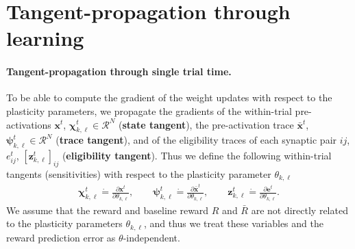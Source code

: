 \documentclass[mlabstract]{jmlr}
\begin{document}
\section{Tangent-propagation through learning}\label{apd:tangents}

\paragraph{Tangent-propagation through single trial time.}
To be able to compute the gradient of the weight updates with respect to the plasticity parameters, we propagate the gradients of the within-trial pre-activations $\mathbf{x}^t$, $\boldsymbol{\chi}_{k,\ell}^t \in \mathcal{R}^N$ (\textbf{state tangent}), the pre-activation trace $\bar{\mathbf{x}}^t$, $\boldsymbol{\psi}_{k,\ell}^t \in \mathcal{R}^N$ (\textbf{trace tangent}), and of the eligibility traces of each synaptic pair $ij$, $e^t_{ij}$, ${[\mathbf{z}^t_{k,\ell}]}_{ij}$ (\textbf{eligibility tangent}).
Thus we define the 
following within-trial tangents (sensitivities) with respect to the plasticity parameter $\theta_{k,\ell}$
\begin{align}\label{eq:single_sensitivities_1}
\boldsymbol{\chi}_{k,\ell}^t \dot{=} \frac{\partial \mathbf{x}^t}{\partial\theta_{k,\ell}},\qquad
\boldsymbol{\psi}_{k,\ell}^t \dot{=} \frac{\partial \mathbf{\bar{x}}^t}{\partial\theta_{k,\ell}},\qquad
\mathbf{z}_{k,\ell}^t \dot{=} \frac{\partial \mathbf{e}^t}{\partial\theta_{k,\ell}}.
\end{align}
We assume that the reward and baseline reward $R$ and $\bar{R}$ are not directly related to the plasticity parameters $\theta_{k,\ell}$, and thus we treat these variables and the reward prediction error as $\theta$-independent.
\end{document}
